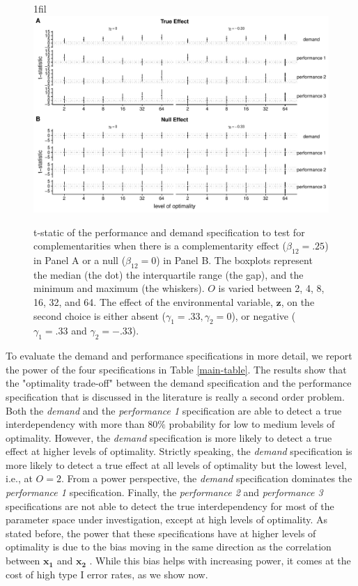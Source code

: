 \documentclass[12pt]{article}
\makeatletter
\newcommand*{\centerfloat}{%
  \parindent \z@
  \leftskip \z@ \@plus 1fil \@minus \textwidth
  \rightskip\leftskip
  \parfillskip \z@skip}
\makeatother
\begin{document}
\begin{figure}
\centerfloat
\includegraphics[width=450px]{figure-latex/main_new_plot.pdf}
\caption[Error Rate  and Power of Demand and Performance Specification]
{\label{main} t-static of the performance and demand specification to test
for complementarities when there is a complementarity effect ($\beta_{12} = .25$)
in Panel A or a null ($\beta_{12} = 0$) in Panel B. The boxplots represent the median (the dot) the interquartile range (the gap), and the minimum and maximum (the whiskers). $O$ is varied between 2, 4, 8, 16, 32, and 64. The effect of the environmental variable, $\mathbf{z}$, on the second choice is either absent ($\gamma_1 = .33,   \gamma_2 = 0$), or negative ($\gamma_1 = .33$ and $\gamma_2 = -.33$).}
\end{figure}



To evaluate the demand and performance specifications in more detail, we report the power of the four specifications in Table \ref{main-table}. The results show that the "optimality trade-off" between the demand specification and the performance specification that is discussed in the literature \citep{grabner_management_2013, aral_three-way_2012, johansson_testing_2018} is really a second order problem. Both the \emph{demand} and the \emph{performance 1} specification are able to detect a true interdependency with more than $80\%$ probability for low to medium levels of optimality. However, the \emph{demand} specification is more likely to detect a true effect at higher levels of optimality. Strictly speaking, the \emph{demand} specification is more likely to detect a true effect at all levels of optimality but the lowest level, i.e., at \(O = 2\). From a power perspective, the \emph{demand} specification dominates the \emph{performance 1} specification. Finally, the \emph{performance 2} and \emph{performance 3} specifications are not able to detect the true interdependency for most of the parameter space under investigation, except at high levels of optimality. As stated before, the power that these specifications have at higher levels of optimality is due to the bias moving in the same direction as the correlation between \(\mathbf{x_1}\) and \(\mathbf{x_2}\) . While this bias helps with increasing power, it comes at the cost of high type I error rates, as we show now.
\end{document}

